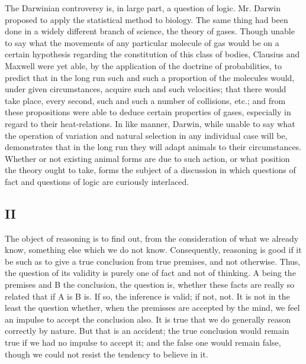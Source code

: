 The Darwinian controversy is, in large part, a question of logic. Mr. Darwin proposed to apply the statistical method to biology. The same thing had been done in a widely different branch of science, the theory of gases. Though unable to say what the movements of any particular molecule of gas would be on a certain hypothesis regarding the constitution of this class of bodies, Clausius and Maxwell were yet able, by the application of the doctrine of probabilities, to predict that in the long run such and such a proportion of the molecules would, under given circumstances, acquire such and such velocities; that there would take place, every second, such and such a number of collisions, etc.; and from these propositions were able to deduce certain properties of gases, especially in regard to their heat-relations. In like manner, Darwin, while unable to say what the operation of variation and natural selection in any individual case will be, demonstrates that in the long run they will adapt animals to their circumstances. Whether or not existing animal forms are due to such action, or what position the theory ought to take, forms the subject of a discussion in which questions of fact and questions of logic are curiously interlaced.

\subsection*{II}

The object of reasoning is to find out, from the consideration of what we already know, something else which we do not know. Consequently, reasoning is good if it be such as to give a true conclusion from true premises, and not otherwise. Thus, the question of its validity is purely one of fact and not of thinking. A being the premises and B the conclusion, the question is, whether these facts are really so related that if A is B is. If so, the inference is valid; if not, not. It is not in the least the question whether, when the premisses are accepted by the mind, we feel an impulse to accept the conclusion also. It is true that we do generally reason correctly by nature. But that is an accident; the true conclusion would remain true if we had no impulse to accept it; and the false one would remain false, though we could not resist the tendency to believe in it.

